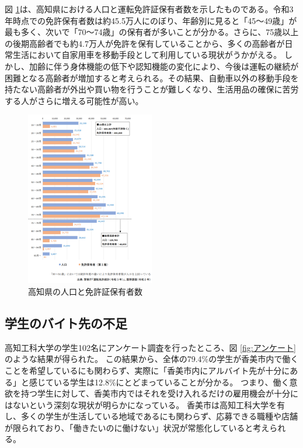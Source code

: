 図 \ref{fig:免許}は、高知県における人口と運転免許証保有者数を示したものである。令和3年時点での免許保有者数は約45.5万人にのぼり、年齢別に見ると「45～49歳」が最も多く、次いで「70～74歳」の保有者が多いことが分かる。さらに、75歳以上の後期高齢者でも約4.7万人が免許を保有していることから、多くの高齢者が日常生活において自家用車を移動手段として利用している現状がうかがえる。
しかし、加齢に伴う身体機能の低下や認知機能の変化により、今後は運転の継続が困難となる高齢者が増加すると考えられる。その結果、自動車以外の移動手段を持たない高齢者が外出や買い物を行うことが難しくなり、生活用品の確保に苦労する人がさらに増える可能性が高い。


\begin{figure}[H]
  \centering
  \includegraphics[width=0.5\textwidth]{免許証.png}
  \caption{高知県の人口と免許証保有者数}
  \label{fig:免許}
\end{figure}


\subsection{学生のバイト先の不足}
高知工科大学の学生102名にアンケート調査を行ったところ、図 \ref{fig:アンケート} のような結果が得られた。 
この結果から、全体の79.4\%の学生が香美市内で働くことを希望しているにも関わらず、実際に「香美市内にアルバイト先が十分にある」と感じている学生は12.8\%にとどまっていることが分かる。 
つまり、働く意欲を持つ学生に対して、香美市内ではそれを受け入れるだけの雇用機会が十分にはないという深刻な現状が明らかになっている。 
香美市は高知工科大学を有し、多くの学生が生活している地域であるにも関わらず、応募できる職種や店舗が限られており、「働きたいのに働けない」状況が常態化していると考えられる。 

